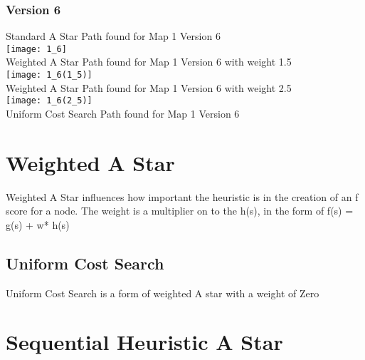 \documentclass[11pt, oneside]{article}   	%
\begin{document}
\subsubsection{Version 6}
Standard A Star Path found for Map 1 Version 6
\\
\texttt{[image: 1\_6]}
\\
Weighted A Star Path found for Map 1 Version 6 with weight 1.5
\\
\texttt{[image: 1\_6(1\_5)]}
\\
Weighted A Star Path found for Map 1 Version 6 with weight 2.5
\\
\texttt{[image: 1\_6(2\_5)]}
\\
Uniform Cost Search Path found for Map 1 Version 6
\\









\newpage
\section{Weighted A Star}
Weighted A Star influences how important the heuristic is in the creation of an f score for a node. The weight is a multiplier on to the h(s), in the form of f(s) = g(s) + w* h(s) 
\subsection{Uniform Cost Search}
Uniform Cost Search is a form of weighted A star with a weight of Zero
\newpage
\section{Sequential Heuristic A Star}
\newpage
\end{document}
